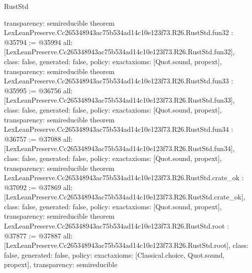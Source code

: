 \begin{lexlean}{RustStd}
\begin{coremodule}
{  transparency: semireducible
}
theorem LexLeanPreserve.Cc265348943ac75b534ad14c10e123f73.R26.RustStd.fun32 : @35794 := @35994 {
  all: [LexLeanPreserve.Cc265348943ac75b534ad14c10e123f73.R26.RustStd.fun32],
  class: false,
  generated: false,
  policy: exact{axioms: [Quot.sound, propext]},
  transparency: semireducible
}
theorem LexLeanPreserve.Cc265348943ac75b534ad14c10e123f73.R26.RustStd.fun33 : @35995 := @36756 {
  all: [LexLeanPreserve.Cc265348943ac75b534ad14c10e123f73.R26.RustStd.fun33],
  class: false,
  generated: false,
  policy: exact{axioms: [Quot.sound, propext]},
  transparency: semireducible
}
theorem LexLeanPreserve.Cc265348943ac75b534ad14c10e123f73.R26.RustStd.fun34 : @36757 := @37088 {
  all: [LexLeanPreserve.Cc265348943ac75b534ad14c10e123f73.R26.RustStd.fun34],
  class: false,
  generated: false,
  policy: exact{axioms: [Quot.sound, propext]},
  transparency: semireducible
}
theorem LexLeanPreserve.Cc265348943ac75b534ad14c10e123f73.R26.RustStd.crate_ok : @37092 := @37869 {
  all: [LexLeanPreserve.Cc265348943ac75b534ad14c10e123f73.R26.RustStd.crate_ok],
  class: false,
  generated: false,
  policy: exact{axioms: [Quot.sound, propext]},
  transparency: semireducible
}
theorem LexLeanPreserve.Cc265348943ac75b534ad14c10e123f73.R26.RustStd.root : @37877 := @37887 {
  all: [LexLeanPreserve.Cc265348943ac75b534ad14c10e123f73.R26.RustStd.root],
  class: false,
  generated: false,
  policy: exact{axioms: [Classical.choice, Quot.sound, propext]},
  transparency: semireducible
}


\end{coremodule}
\end{lexlean}
